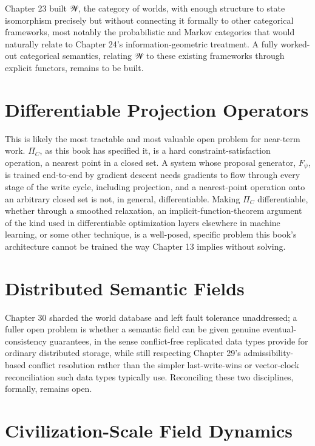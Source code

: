 Chapter 23 built 𝒲, the category of worlds, with enough structure to state isomorphism precisely but without connecting it formally to other categorical frameworks, most notably the probabilistic and Markov categories that would naturally relate to Chapter 24's information-geometric treatment. A fully worked-out categorical semantics, relating 𝒲 to these existing frameworks through explicit functors, remains to be built.

\section{Differentiable Projection Operators}

This is likely the most tractable and most valuable open problem for near-term work. \(\Pi_C\), as this book has specified it, is a hard constraint-satisfaction operation, a nearest point in a closed set. A system whose proposal generator, \(F_\psi\), is trained end-to-end by gradient descent needs gradients to flow through every stage of the write cycle, including projection, and a nearest-point operation onto an arbitrary closed set is not, in general, differentiable. Making \(\Pi_C\) differentiable, whether through a smoothed relaxation, an implicit-function-theorem argument of the kind used in differentiable optimization layers elsewhere in machine learning, or some other technique, is a well-posed, specific problem this book's architecture cannot be trained the way Chapter 13 implies without solving.

\section{Distributed Semantic Fields}

Chapter 30 sharded the world database and left fault tolerance unaddressed; a fuller open problem is whether a semantic field can be given genuine eventual-consistency guarantees, in the sense conflict-free replicated data types provide for ordinary distributed storage, while still respecting Chapter 29's admissibility-based conflict resolution rather than the simpler last-write-wins or vector-clock reconciliation such data types typically use. Reconciling these two disciplines, formally, remains open.

\section{Civilization-Scale Field Dynamics}

